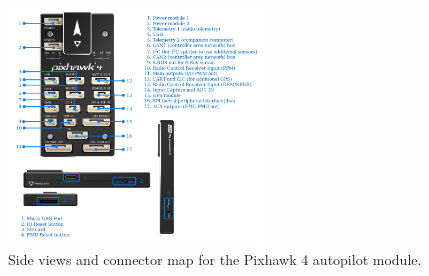 \begin{figure}[H]
  \centering
  \includegraphics[width=0.6\textwidth,keepaspectratio]{img/pixhawk4.jpg}
  \caption{Side views and connector map for the Pixhawk 4 autopilot module.}
  \label{fig:pixhawk4}
\end{figure}




